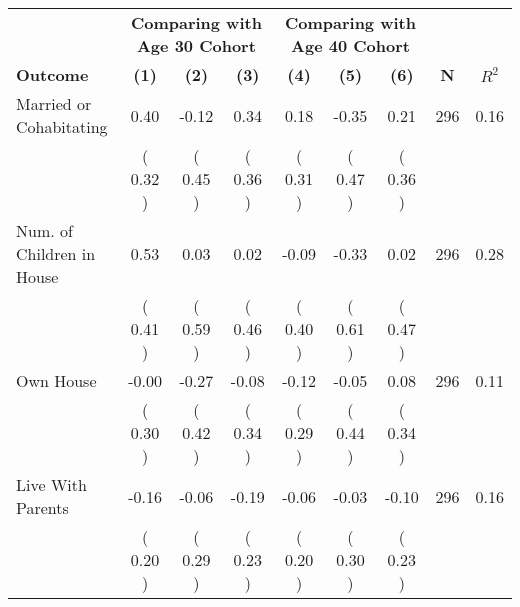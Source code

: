 \begin{tabular}{lcccccccc}
\toprule
 & \multicolumn{3}{c}{\textbf{Comparing with Age 30 Cohort}} & \multicolumn{3}{c}{\textbf{Comparing with Age 40 Cohort}} & \\
\cmidrule(lr){2-4} \cmidrule(lr){5-7} 
 \textbf{Outcome} & \textbf{(1)} & \textbf{(2)} & \textbf{(3)} & \textbf{(4)} & \textbf{(5)} & \textbf{(6)} & \textbf{N} & \textbf{$ R^2$} \\
\midrule
Married or Cohabitating &      0.40 &     -0.12 &      0.34 &      0.18 &     -0.35 &      0.21 & 296 &       0.16 \\ 
 & (     0.32 ) & (     0.45 ) & (     0.36 ) & (     0.31 ) & (     0.47 ) & (     0.36 ) & \\
Num. of Children in House &      0.53 &      0.03 &      0.02 &     -0.09 &     -0.33 &      0.02 & 296 &       0.28 \\ 
 & (     0.41 ) & (     0.59 ) & (     0.46 ) & (     0.40 ) & (     0.61 ) & (     0.47 ) & \\
Own House &     -0.00 &     -0.27 &     -0.08 &     -0.12 &     -0.05 &      0.08 & 296 &       0.11 \\ 
 & (     0.30 ) & (     0.42 ) & (     0.34 ) & (     0.29 ) & (     0.44 ) & (     0.34 ) & \\
Live With Parents &     -0.16 &     -0.06 &     -0.19 &     -0.06 &     -0.03 &     -0.10 & 296 &       0.16 \\ 
 & (     0.20 ) & (     0.29 ) & (     0.23 ) & (     0.20 ) & (     0.30 ) & (     0.23 ) & \\
\bottomrule
\end{tabular}
